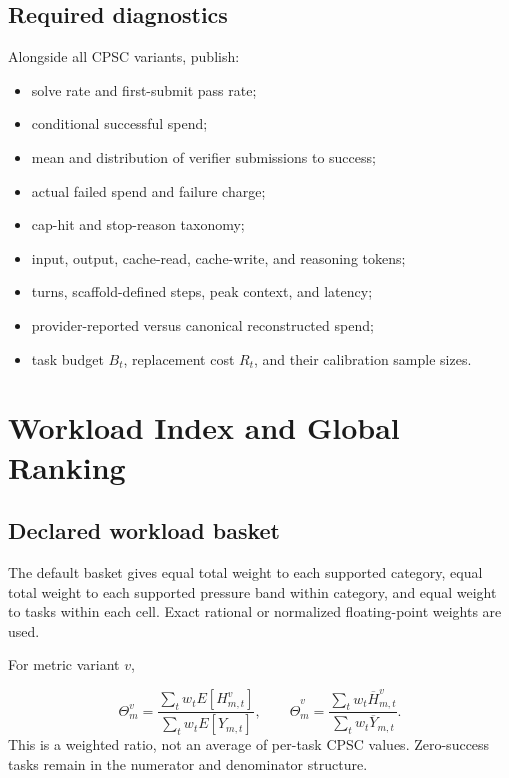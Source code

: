 \documentclass[11pt]{article}
\begin{document}
\subsection{Required diagnostics}\hypertarget{87-required-diagnostics}{}\label{87-required-diagnostics}

Alongside all CPSC variants, publish:

\begin{itemize}
\item{} solve rate and first-submit pass rate;
\item{} conditional successful spend;
\item{} mean and distribution of verifier submissions to success;
\item{} actual failed spend and failure charge;
\item{} cap-hit and stop-reason taxonomy;
\item{} input, output, cache-read, cache-write, and reasoning tokens;
\item{} turns, scaffold-defined steps, peak context, and latency;
\item{} provider-reported versus canonical reconstructed spend;
\item{} task budget $B_t$, replacement cost $R_t$, and their calibration sample sizes.
\end{itemize}

\section{Workload Index and Global Ranking}\hypertarget{9-workload-index-and-global-ranking}{}\label{9-workload-index-and-global-ranking}

\subsection{Declared workload basket}\hypertarget{91-declared-workload-basket}{}\label{91-declared-workload-basket}

The default basket gives equal total weight to each supported category, equal total weight to each supported pressure band within category, and equal weight to tasks within each cell. Exact rational or normalized floating-point weights are used.

For metric variant $v$,

\[
\Theta^v_m=
\frac{\sum_t w_tE[H^v_{m,t}]}
{\sum_t w_tE[Y_{m,t}]},
\qquad
\widehat\Theta^v_m=
\frac{\sum_t w_t\overline H^v_{m,t}}
{\sum_t w_t\overline Y_{m,t}}.
\]
This is a weighted ratio, not an average of per-task CPSC values. Zero-success tasks remain in the numerator and denominator structure.
\end{document}
